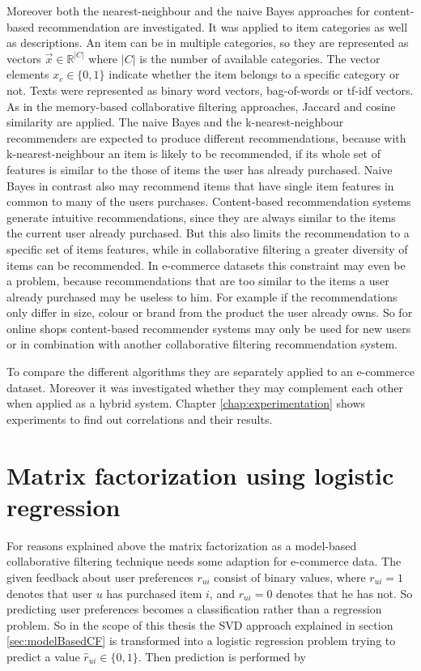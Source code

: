 \documentclass[10pt]{reportMaster}
\begin{document}
Moreover both the nearest-neighbour and the naive Bayes approaches for content-based recommendation are investigated.
It was applied to item categories as well as descriptions.
An item can be in multiple categories, so they are represented as vectors $\vec{x} \in \mathds{R}^{|C|}$ where $|C|$ is the number of available categories.
The vector elements $x_c \in \{0,1\}$ indicate whether the item belongs to a specific category or not. 
Texts were represented as binary word vectors, bag-of-words or tf-idf vectors. %
As in the memory-based collaborative filtering approaches, Jaccard and cosine similarity are applied.
The naive Bayes and the k-nearest-neighbour recommenders are expected to produce different recommendations, because with k-nearest-neighbour an item is likely to be recommended, if its whole set of features is similar to the those of items the user has already purchased.
Naive Bayes in contrast also may recommend items that have single item features in common to many of the users purchases.
Content-based recommendation systems generate intuitive recommendations, since they are always similar to the items the current user already purchased.
But this also limits the recommendation to a specific set of items features, while in collaborative filtering a greater diversity of items can be recommended.
In e-commerce datasets this constraint may even be a problem, because recommendations that are too similar to the items a user already purchased may be useless to him.
For example if the recommendations only differ in size, colour or brand from the product the user already owns.
So for online shops content-based recommender systems may only be used for new users or in combination with another collaborative filtering recommendation system. %

To compare the different algorithms they are separately applied to an e-commerce dataset.
Moreover it was investigated whether they may complement each other when applied as a hybrid system.
Chapter \ref{chap:experimentation} shows experiments to find out correlations and their results.


\section{Matrix factorization using logistic regression}
\label{sec:logRegSVD}

For reasons explained above the matrix factorization as a model-based collaborative filtering technique needs some adaption for e-commerce data.
The given feedback about user preferences $r_{ui}$ consist of binary values, where $r_{ui} = 1$ denotes that user $u$ has purchased item $i$, and $r_{ui} = 0$ denotes that he has not.
So predicting user preferences becomes a classification rather than a regression problem.
So in the scope of this thesis the SVD approach explained in section \ref{sec:modelBasedCF} is transformed into a logistic regression problem trying to predict a value $\hat{r}_{ui} \in \{0,1\}$.
Then prediction is performed by 
\end{document}
